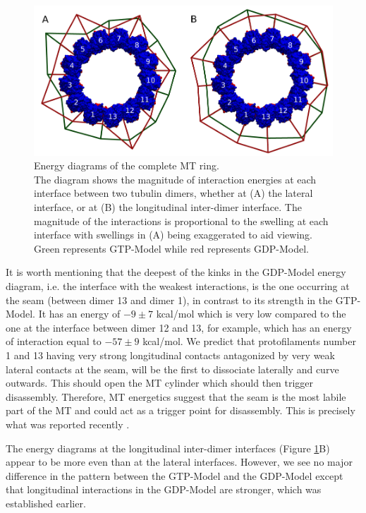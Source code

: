 \documentclass[11pt]{report}
\begin{document}
\begin{figure}[h]
  \centering
  \includegraphics[width=0.9\linewidth]{images/MTdist.pdf}
  \caption[Energy diagrams of the complete MT ring]{{ Energy diagrams of the complete MT ring.}\\
  The diagram shows the magnitude of interaction energies
  at each interface between two tubulin dimers, whether
  at (A) the lateral interface, or at (B) the longitudinal inter-dimer
  interface. The magnitude of the interactions is proportional to the swelling at each interface with swellings
  in (A) being exaggerated to aid viewing.
  Green represents GTP-Model while red represents GDP-Model.}
  \label{fig:Ediag}
\end{figure}

It is worth mentioning that the deepest of the kinks in
the GDP-Model energy diagram, i.e. the interface
with the weakest interactions, is the one occurring at the seam
(between dimer 13 and dimer 1), in contrast to its 
strength in the GTP-Model. It has an energy of 
$-9\pm7$ kcal/mol which is very low compared to the one at the interface between dimer 12 and 13, for example,
which has an energy of interaction equal to
$-57\pm9$ kcal/mol. 
We predict that protofilaments number 1 and 13 having
very strong longitudinal contacts 
antagonized by
very weak lateral contacts at the seam,
will be the first to dissociate laterally
and curve outwards. This should open the MT 
cylinder which should then
trigger disassembly.
Therefore, MT energetics suggest that the seam
is the most labile part of the MT and could act as a trigger
point for disassembly. This is precisely what
was reported recently \cite{Katsuki2014}.


The energy diagrams at the longitudinal inter-dimer interfaces
(Figure \ref{fig:Ediag}B) appear to be more even
than at the lateral interfaces.
However, we see no major difference in the pattern between 
the GTP-Model and the GDP-Model except that longitudinal interactions in the GDP-Model
are stronger, which was established 
earlier.
\end{document}
